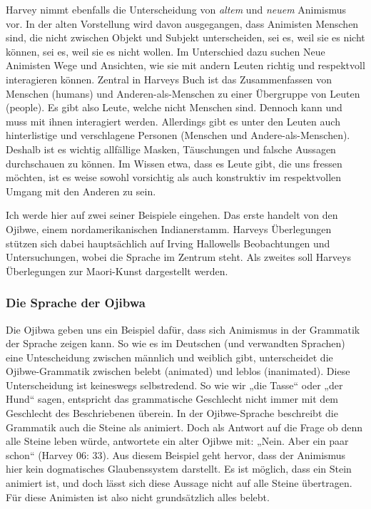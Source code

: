 Harvey nimmt ebenfalls die Unterscheidung von \emph{altem} und \emph{neuem} Animismus vor. In der alten Vorstellung wird davon ausgegangen, dass Animisten Menschen sind, die nicht zwischen Objekt und Subjekt unterscheiden, sei es, weil sie es nicht können, sei es, weil sie es nicht wollen. Im Unterschied dazu suchen Neue Animisten Wege und Ansichten, wie sie mit andern Leuten richtig und respektvoll interagieren können. Zentral in Harveys Buch ist das Zusammenfassen von Menschen (humans) und Anderen-als-Menschen zu einer Übergruppe von Leuten (people). Es gibt also Leute, welche nicht Menschen sind. Dennoch kann und muss mit ihnen interagiert werden. Allerdings gibt es unter den Leuten auch hinterlistige und verschlagene Personen (Menschen und Andere-als-Menschen). Deshalb ist es wichtig allfällige Masken, Täuschungen und falsche Aussagen durchschauen zu können. Im Wissen etwa, dass es Leute gibt, die uns fressen möchten, ist es weise sowohl vorsichtig als auch konstruktiv im respektvollen Umgang mit den Anderen zu sein. 

Ich werde hier auf zwei seiner Beispiele eingehen. Das erste handelt von den Ojibwe, einem nordamerikanischen Indianerstamm. Harveys Überlegungen stützen sich dabei hauptsächlich auf Irving Hallowells Beobachtungen und Untersuchungen, wobei die Sprache im Zentrum steht. Als zweites soll Harveys Überlegungen zur Maori-Kunst dargestellt werden.

\subsubsection*{Die Sprache der Ojibwa}
Die Ojibwa geben uns ein Beispiel dafür, dass sich Animismus in der Grammatik der Sprache zeigen kann. So wie es im Deutschen (und verwandten Sprachen) eine Untescheidung zwischen männlich und weiblich gibt, unterscheidet die Ojibwe-Grammatik zwischen belebt (animated) und leblos (inanimated). Diese Unterscheidung ist keineswegs selbstredend. So wie wir „die Tasse“ oder „der Hund“ sagen, entspricht das grammatische Geschlecht nicht immer mit dem Geschlecht des Beschriebenen überein. In der Ojibwe-Sprache beschreibt die Grammatik auch die Steine als animiert. Doch als Antwort auf die Frage ob denn alle Steine leben würde, antwortete ein alter Ojibwe mit: „Nein. Aber ein paar schon“ (Harvey 06: 33). Aus diesem Beispiel geht hervor, dass der Animismus hier kein dogmatisches Glaubenssystem darstellt. Es ist möglich, dass ein Stein animiert ist, und doch lässt sich diese Aussage nicht auf alle Steine übertragen. Für diese Animisten ist also nicht grundsätzlich alles belebt. 

